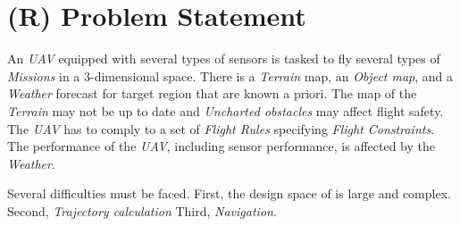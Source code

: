 \chapter{(R) Problem Statement}\label{c:problemStatement}

\noindent An \emph{UAV} equipped with several types of sensors is tasked to fly several types of \emph{Missions} in a 3-dimensional space. There is a \emph{Terrain} map, an \emph{Object map}, and a \emph{Weather} forecast for target region that are  known a priori. The map of the \emph{Terrain} may not be up to date and \emph{Uncharted obstacles} may affect flight safety. The \emph{UAV} has to comply to a set of \emph{Flight Rules} specifying \emph{Flight Constraints}. The performance of the \emph{UAV}, including sensor performance, is affected by the \emph{Weather}.


Several difficulties must be faced.  First, the design space of is large and complex. Second, \emph{Trajectory calculation} Third, \emph{Navigation}.